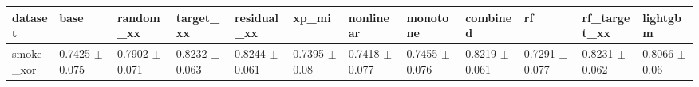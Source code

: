 \begin{tabular}{llllllllllll}
\toprule
dataset & base & random\_xx & target\_xx & residual\_xx & xp\_mi & nonlinear & monotone & combined & rf & rf\_target\_xx & lightgbm \\
\midrule
smoke\_xor & 0.7425 $\pm$ 0.075 & 0.7902 $\pm$ 0.071 & 0.8232 $\pm$ 0.063 & 0.8244 $\pm$ 0.061 & 0.7395 $\pm$ 0.08 & 0.7418 $\pm$ 0.077 & 0.7455 $\pm$ 0.076 & 0.8219 $\pm$ 0.061 & 0.7291 $\pm$ 0.077 & 0.8231 $\pm$ 0.062 & 0.8066 $\pm$ 0.06 \\
\bottomrule
\end{tabular}
